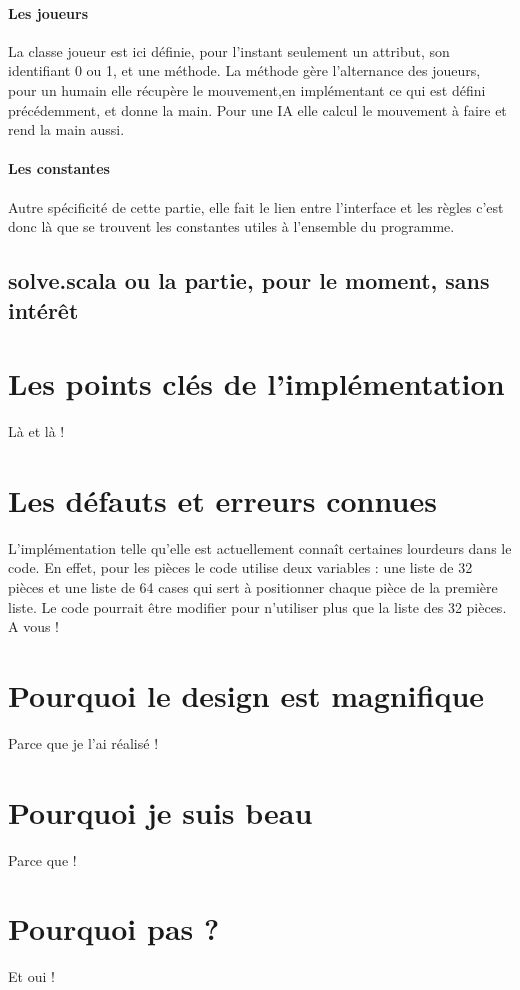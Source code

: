 \documentclass[a4paper]{article}
\begin{document}
\paragraph{Les joueurs} La classe joueur est ici définie, pour l'instant seulement un attribut, son identifiant 0 ou 1, et une méthode. La méthode gère l'alternance des joueurs, pour un humain elle récupère le mouvement,en implémentant ce qui est défini précédemment, et donne la main. Pour une IA elle calcul le mouvement à faire et rend la main aussi.

\paragraph{Les constantes} Autre spécificité de cette partie, elle fait le lien entre l'interface et les règles c'est donc là que se trouvent les constantes utiles à l'ensemble du programme.

\subsection{solve.scala ou la partie, pour le moment, sans intérêt}

\section{Les points clés de l'implémentation}

Là et là !

\section{Les défauts et erreurs connues}

L'implémentation telle qu'elle est actuellement connaît certaines lourdeurs dans le code. En effet, pour les pièces le code utilise deux variables : une liste de 32 pièces et une liste de 64 cases qui sert à positionner chaque pièce de la première liste. Le code pourrait être modifier pour n'utiliser plus que la liste des 32 pièces. \\

A vous !

\section{Pourquoi le design est magnifique}

Parce que je l'ai réalisé !

\section{Pourquoi je suis beau}

Parce que !

\section{Pourquoi pas ?}

Et oui !
\end{document}
